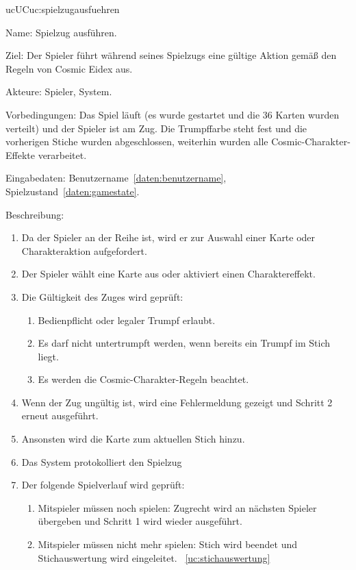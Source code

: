 \begin{description}[leftmargin=5em, style=sameline]
    \begin{lhp}{uc}{UC}{uc:spielzugausfuehren}
    \item [Name:] Spielzug ausführen.
    \item [Ziel:] Der Spieler führt während seines Spielzugs eine gültige Aktion gemäß den Regeln von Cosmic Eidex aus.
    \item [Akteure:] Spieler, System.
    \item [Vorbedingungen:] Das Spiel läuft (es wurde gestartet und die 36 Karten wurden verteilt) und der Spieler ist am Zug. Die Trumpffarbe steht fest und die vorherigen Stiche wurden abgeschlossen, weiterhin wurden alle Cosmic-Charakter-Effekte verarbeitet.
    \item [Eingabedaten:] Benutzername~\ref{daten:benutzername}, Spielzustand~\ref{daten:gamestate}.
    \item[Beschreibung:]
        \begin{enumerate}
             \item Da der Spieler an der Reihe ist, wird er zur Auswahl einer Karte oder Charakteraktion aufgefordert.
              \item Der Spieler wählt eine Karte aus oder aktiviert einen Charaktereffekt.
              \item Die Gültigkeit des Zuges wird geprüft:
              \begin{enumerate}
                    \item Bedienpflicht oder legaler Trumpf erlaubt.
                    \item Es darf nicht untertrumpft werden, wenn bereits ein Trumpf im Stich liegt.
                   \item Es werden die Cosmic-Charakter-Regeln beachtet.
              \end{enumerate}
              \item Wenn der Zug ungültig ist, wird eine Fehlermeldung gezeigt und Schritt 2 erneut ausgeführt.
              \item Ansonsten wird die Karte zum aktuellen Stich hinzu.
              \item Das System protokolliert den Spielzug
              \item Der folgende Spielverlauf wird geprüft:
                \begin{enumerate}
                    \item Mitspieler müssen noch spielen: Zugrecht wird an nächsten Spieler übergeben und Schritt 1 wird wieder ausgeführt.
                    \item Mitspieler müssen nicht mehr spielen: Stich wird beendet und Stichauswertung wird eingeleitet. ~\ref{uc:stichauswertung}

\end{enumerate}
\end{enumerate}
\end{lhp}
\end{description}
